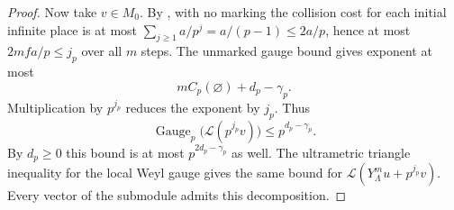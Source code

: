 \begin{proof}
Now take $v\in M_0$. By , with no marking the collision cost for each initial infinite place is at most $\sum_{j\ge1}a/p^j=a/(p-1)\le 2a/p$, hence at most $2mfa/p\le j_p$ over all $m$ steps. The unmarked gauge bound gives exponent at most
\[
 m C_p(\varnothing)+d_p-\gamma_p.
\]
Multiplication by $p^{j_p}$ reduces the exponent by $j_p$. Thus
\[
 \operatorname{Gauge}_p\bigl(\mathcal L(p^{j_p}v)\bigr)\le p^{d_p-\gamma_p}.
\]
By $d_p\ge0$ this bound is at most $p^{2d_p-\gamma_p}$ as well. The ultrametric triangle inequality for the local Weyl gauge gives the same bound for $\mathcal L(Y_\Lambda^m u+p^{j_p}v)$. Every vector of the submodule admits this decomposition.
\end{proof}


